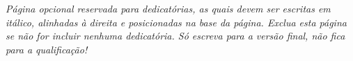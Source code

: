 \begin{dedicatoria}
    \vspace*{\fill}
	\begin{flushright}
		\textit{Página opcional reservada para dedicatórias, as quais devem ser escritas em itálico, alinhadas à direita e posicionadas na base da página. Exclua esta página se não for incluir nenhuma dedicatória. Só escreva para a versão final, não fica para a qualificação!}
	\end{flushright}
\end{dedicatoria}